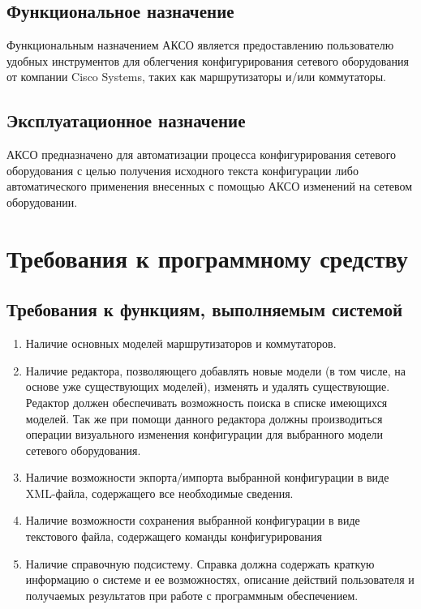 \documentclass[a4paper,14pt]{extreport}
\begin{document}
	\subsection{Функциональное назначение}
	
	Функциональным назначением АКСО является предоставлению пользователю удобных инструментов для облегчения конфигурирования сетевого оборудования от компании Cisco Systems, таких как маршрутизаторы и/или коммутаторы.
	
	\subsection{Эксплуатационное назначение}
	
	АКСО предназначено для автоматизации процесса конфигурирования сетевого оборудования с целью получения исходного текста конфигурации либо автоматического применения внесенных с помощью АКСО изменений на сетевом оборудовании.
	
	\section{Требования к программному средству}
	
	\subsection{Требования к функциям, выполняемым системой }
	
	\begin{enumerate}
		
		\item Наличие основных моделей маршрутизаторов и коммутаторов.
		
		\item Наличие редактора, позволяющего добавлять новые модели (в том числе, на основе уже существующих моделей), изменять и удалять существующие. Редактор должен обеспечивать возможность поиска в списке имеющихся моделей. Так же при помощи данного редактора должны производиться операции визуального изменения конфигурации для выбранного модели сетевого оборудования.
		
		\item Наличие возможности экпорта/импорта выбранной конфигурации в виде XML-файла, содержащего все необходимые сведения.
		
		\item Наличие возможности сохранения выбранной конфигурации в виде текстового файла, содержащего команды конфигурирования
		
		\item Наличие справочную подсистему. Справка должна содержать краткую информацию о системе и ее возможностях, описание действий пользователя и получаемых результатов при работе с программным обеспечением.
	\end{enumerate}
	
\end{document}
